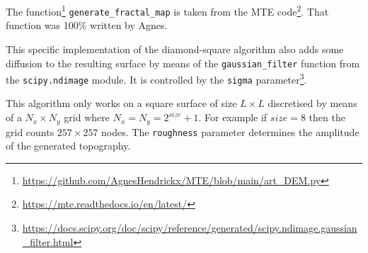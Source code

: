The function\footnote{\url{https://github.com/AgnesHendrickx/MTE/blob/main/art_DEM.py}}
 {\tt generate\_fractal\_map} is taken from the MTE code\footnote{\url{https://mte.readthedocs.io/en/latest/}}. That function was 100\% written by Agnes.

This specific implementation of the diamond-square algorithm also adds some diffusion to the resulting surface by 
means of the {\tt gaussian\_filter} function from the {\tt scipy.ndimage} module. It is controlled
by the {\tt sigma} parameter\footnote{\url{https://docs.scipy.org/doc/scipy/reference/generated/scipy.ndimage.gaussian_filter.html}}.

This algorithm only works on a square surface of size $L\times L$
discretised by means of a $N_x \times N_y$ grid where 
$N_x=N_y=2^{size}+1$. For example if $size=8$ then the grid counts 
$257\times 257$ nodes.
The {\tt roughness} parameter determines the amplitude of the generated 
topography. 

